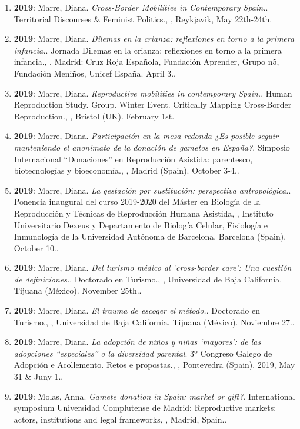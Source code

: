 \begin{enumerate}
\item {\bf 2019}: Marre, Diana. {\it Cross-Border Mobilities in Contemporary Spain.}. Territorial Discourses \& Feminist Politics., , Reykjavik, May 22th-24th.\filbreak
\item {\bf 2019}: Marre, Diana. {\it Dilemas en la crianza: reflexiones en torno a la primera infancia.}. Jornada Dilemas en la crianza: reflexiones en torno a la primera infancia., , Madrid: Cruz Roja Española, Fundación Aprender, Grupo n5, Fundación Meniños, Unicef España. April 3..\filbreak
\item {\bf 2019}: Marre, Diana. {\it Reproductive mobilities in contemporary Spain.}. Human Reproduction Study. Group. Winter Event. Critically Mapping Cross-Border Reproduction., , Bristol (UK). February 1st.\filbreak
\item {\bf 2019}: Marre, Diana. {\it Participación en la mesa redonda ¿Es posible seguir manteniendo el anonimato de la donación de gametos en España?}. Simposio Internacional “Donaciones” en Reproducción Asistida: parentesco, biotecnologías y bioeconomía., , Madrid (Spain). October 3-4..\filbreak
\item {\bf 2019}: Marre, Diana. {\it La gestación por sustitución: perspectiva antropológica.}. Ponencia inaugural del curso 2019-2020 del Máster en Biología de la Reproducción y Técnicas de Reproducción Humana Asistida, , Instituto Universitario Dexeus y Departamento de Biología Celular, Fisiología e Inmunología de la Universidad Autónoma de Barcelona. Barcelona (Spain). October 10..\filbreak
\item {\bf 2019}: Marre, Diana. {\it Del turismo médico al 'cross-border care': Una cuestión de definiciones.}. Doctorado en Turismo., , Universidad de Baja California. Tijuana (México). November 25th..\filbreak
\item {\bf 2019}: Marre, Diana. {\it El trauma de escoger el método.}. Doctorado en Turismo., , Universidad de Baja California. Tijuana (México). Noviembre 27..\filbreak
\item {\bf 2019}: Marre, Diana. {\it La adopción de niños y niñas ‘mayores’: de las adopciones “especiales” o la diversidad parental}. 3º Congreso Galego de Adopción e Acollemento. Retos e propostas., , Pontevedra (Spain). 2019, May 31 \& Juny 1..\filbreak
\item {\bf 2019}: Molas, Anna. {\it Gamete donation in Spain: market or gift?}. International symposium Universidad Complutense de Madrid: Reproductive markets: actors, institutions and legal frameworks, , Madrid, Spain..\filbreak

\end{enumerate}
